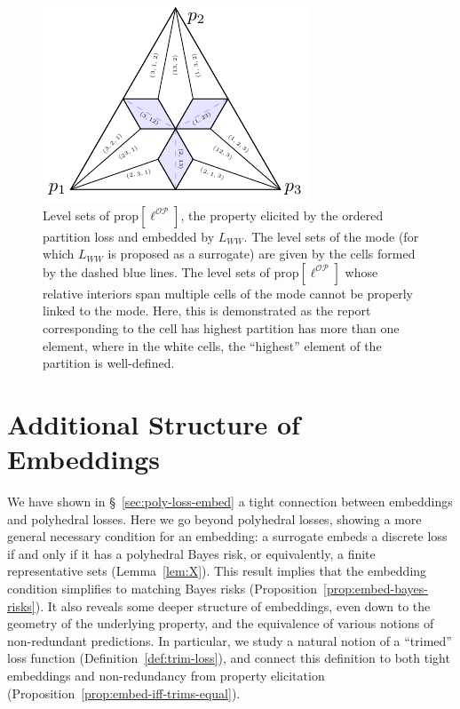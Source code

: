 \documentclass[11pt]{article}
\newcommand{\prop}[1]{\mathrm{prop}[#1]}
\newcommand{\OP}{\mathcal{OP}}
\begin{document}
\begin{figure}[H]
	\begin{minipage}{0.5\linewidth}
		\centering
		\includegraphics[width=0.9\linewidth]{tikz/ordered-partition}
	\end{minipage}
	\hfill
	\begin{minipage}{0.45\linewidth}
		\caption{Level sets of $\prop{\ell^\OP}$, the property elicited by the ordered partition loss and embedded by $L_{WW}$.
			The level sets of the mode (for which $L_{WW}$ is proposed as a surrogate) are given by the cells formed by the dashed blue lines.
			The level sets of $\prop{\ell^\OP}$ whose relative interiors span multiple cells of the mode cannot be properly linked to the mode.
			Here, this is demonstrated as the report corresponding to the cell has highest partition has more than one element, where in the white cells, the ``highest'' element of the partition is well-defined.}
		\label{fig:ordered-partition}
	\end{minipage}
\end{figure}






\section{Additional Structure of Embeddings}
\label{sec:min-rep-sets}

We have shown in \S~\ref{sec:poly-loss-embed} a tight connection between embeddings and polyhedral losses.
Here we go beyond polyhedral losses, showing a more general necessary condition for an embedding: a surrogate embeds a discrete loss if and only if it has a polyhedral Bayes risk, or equivalently, a finite representative sets (Lemma~\ref{lem:X}).
This result implies that the embedding condition simplifies to matching Bayes risks (Proposition~\ref{prop:embed-bayes-risks}).
It also reveals some deeper structure of embeddings, even down to the geometry of the underlying property, and the equivalence of various notions of non-redundant predictions.
In particular, we study a natural notion of a ``trimed'' loss function (Definition~\ref{def:trim-loss}), and connect this definition to both tight embeddings and non-redundancy from property elicitation (Proposition~\ref{prop:embed-iff-trims-equal}).
 
\end{document}
